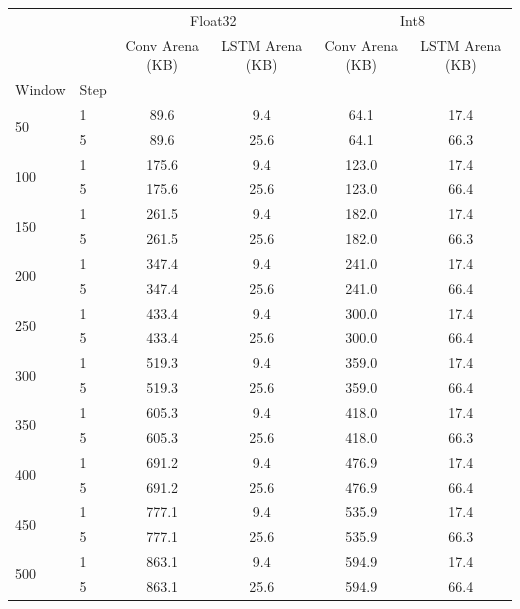 \begin{tabular}{llcccc}
\toprule
 &  & \multicolumn{2}{c}{Float32} & \multicolumn{2}{c}{Int8} \\
 &  & Conv Arena (KB) & LSTM Arena (KB) & Conv Arena (KB) & LSTM Arena (KB) \\
Window & Step &  &  &  &  \\
\midrule
\multirow[c]{2}{*}{50} & 1 & 89.6 & 9.4 & 64.1 & 17.4 \\
 & 5 & 89.6 & 25.6 & 64.1 & 66.3 \\
\multirow[c]{2}{*}{100} & 1 & 175.6 & 9.4 & 123.0 & 17.4 \\
 & 5 & 175.6 & 25.6 & 123.0 & 66.4 \\
\multirow[c]{2}{*}{150} & 1 & 261.5 & 9.4 & 182.0 & 17.4 \\
 & 5 & 261.5 & 25.6 & 182.0 & 66.3 \\
\multirow[c]{2}{*}{200} & 1 & 347.4 & 9.4 & 241.0 & 17.4 \\
 & 5 & 347.4 & 25.6 & 241.0 & 66.4 \\
\multirow[c]{2}{*}{250} & 1 & 433.4 & 9.4 & 300.0 & 17.4 \\
 & 5 & 433.4 & 25.6 & 300.0 & 66.4 \\
\multirow[c]{2}{*}{300} & 1 & 519.3 & 9.4 & 359.0 & 17.4 \\
 & 5 & 519.3 & 25.6 & 359.0 & 66.4 \\
\multirow[c]{2}{*}{350} & 1 & 605.3 & 9.4 & 418.0 & 17.4 \\
 & 5 & 605.3 & 25.6 & 418.0 & 66.3 \\
\multirow[c]{2}{*}{400} & 1 & 691.2 & 9.4 & 476.9 & 17.4 \\
 & 5 & 691.2 & 25.6 & 476.9 & 66.4 \\
\multirow[c]{2}{*}{450} & 1 & 777.1 & 9.4 & 535.9 & 17.4 \\
 & 5 & 777.1 & 25.6 & 535.9 & 66.3 \\
\multirow[c]{2}{*}{500} & 1 & 863.1 & 9.4 & 594.9 & 17.4 \\
 & 5 & 863.1 & 25.6 & 594.9 & 66.4 \\
\bottomrule
\end{tabular}
